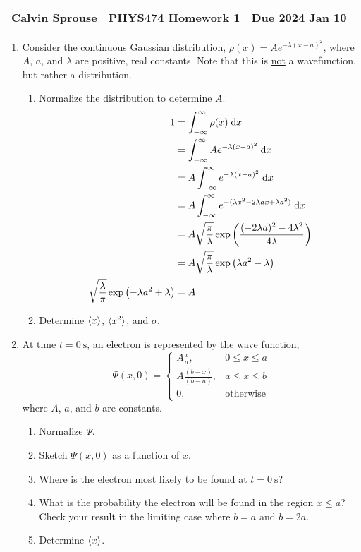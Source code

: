 \documentclass[a4paper, 12pt]{config/homework}
\begin{document}
\noindent
\begin{tabularx}{\textwidth}{>{\centering\arraybackslash}X>{\centering\arraybackslash}X>{\centering\arraybackslash}X}
Calvin Sprouse & PHYS474 Homework 1 & Due 2024 Jan 10\\
\midrule
\end{tabularx}

\begin{enumerate}
\item Consider the continuous Gaussian distribution, \(\rho(x) = Ae^{-\lambda (x-a)^2}\), where \(A\), \(a\), and \(\lambda \) are positive, real constants. Note that this is \underline{not} a wavefunction, but rather a distribution.
\begin{enumerate}[label=(\alph*)]
\item Normalize the distribution to determine \(A\).
\begin{align*}
1 &= \bint{-\infty}{\infty}{\rho(x)}{x}
\\&= \bint{-\infty}{\infty}{Ae^{-\lambda (x-a)^2}}{x}
\\&= A \bint{-\infty}{\infty}{e^{-\lambda (x-a)^2}}{x}
\\&= A \bint{-\infty}{\infty}{e^{-(\lambda x^2 -2\lambda ax + \lambda a^2)}}{x}
\\&= A \sqrt{\frac{\pi}{\lambda}} \exp\left({\frac{(-2\lambda a)^2 - 4\lambda^2}{4\lambda}}\right)
\\&= A \sqrt{\frac{\pi}{\lambda}} \exp\left(\lambda a^2 - \lambda\right)
\\\sqrt{\frac{\lambda}{\pi}} \exp\left(-\lambda a^2 + \lambda\right) &= A
\end{align*}

\item Determine \(\braket{x}\), \(\braket{x^2}\), and \(\sigma\).
\end{enumerate}

\pagebreak
\item At time \(t=\qty{0}{\second}\), an electron is represented by the wave function,
\[\Psi(x, 0) = \begin{cases}
    A\frac{x}{a}, & 0 \le x \le a \\
    A \frac{(b-x)}{(b-a)}, & a \le x \le b \\
    0, & \text{otherwise}
\end{cases}\]
where \(A\), \(a\), and \(b\) are constants.
\begin{enumerate}[label=(\alph*)]
\item Normalize \(\Psi\).
\item Sketch \(\Psi(x,0)\) as a function of \(x\).
\item Where is the electron most likely to be found at \(t=\qty{0}{\second}\)?
\item What is the probability the electron will be found in the region \(x \le a\)? Check your result in the limiting case where \(b=a\) and \(b=2a\).
\item Determine \(\braket{x}\).
\end{enumerate}
\end{enumerate}
\end{document}
